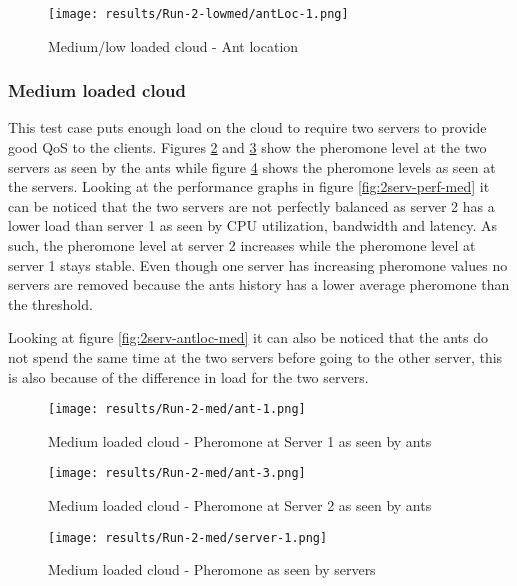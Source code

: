 \begin{figure}
	\centering
		\texttt{[image: results/Run-2-lowmed/antLoc-1.png]}
	\caption{Medium/low loaded cloud - Ant location}
	\label{fig:2serv-antloc-medlow}
\end{figure}

\subsubsection{Medium loaded cloud}

This test case puts enough load on the cloud to require two servers to provide good QoS to the clients. Figures \ref{fig:2serv-ant1-med} and \ref{fig:2serv-ant3-med} show the pheromone level at the two servers as seen by the ants while figure \ref{fig:2serv-pher-med} shows the pheromone levels as seen at the servers. Looking at the performance graphs in figure \ref{fig:2serv-perf-med} it can be noticed that the two servers are not perfectly balanced as server 2 has a lower load than server 1 as seen by CPU utilization, bandwidth and latency. As such, the pheromone level at server 2 increases while the pheromone level at server 1 stays stable. Even though one server has increasing pheromone values no servers are removed because the ants history has a lower average pheromone than the threshold.

Looking at figure \ref{fig:2serv-antloc-med} it can also be noticed that the ants do not spend the same time at the two servers before going to the other server, this is also because of the difference in load for the two servers.

\begin{figure}[!ht]
	\centering
		\texttt{[image: results/Run-2-med/ant-1.png]}
	\caption{Medium loaded cloud - Pheromone at Server 1 as seen by ants}
	\label{fig:2serv-ant1-med}
\end{figure}

\begin{figure}
	\centering
		\texttt{[image: results/Run-2-med/ant-3.png]}
	\caption{Medium loaded cloud - Pheromone at Server 2 as seen by ants}
	\label{fig:2serv-ant3-med}
\end{figure}

\begin{figure}
	\centering
		\texttt{[image: results/Run-2-med/server-1.png]}
	\caption{Medium loaded cloud - Pheromone as seen by servers}
	\label{fig:2serv-pher-med}
\end{figure}

